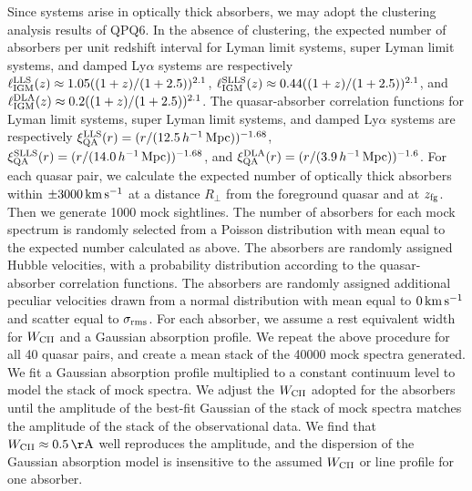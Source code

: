 \documentclass[iop]{emulateapj}
\begin{document}
Since  systems arise in optically thick absorbers, we may adopt the clustering analysis
results of QPQ6. In the absence of clustering, the expected number of absorbers per unit redshift
interval for Lyman limit systems, super Lyman limit systems, and damped Ly$\alpha$ systems are
respectively $\ell_{\rm IGM}^{\rm LLS}(z)\approx1.05((1+z)/(1+2.5))^{2.1}$,
$\ell_{\rm IGM}^{\rm SLLS}(z)\approx0.44((1+z)/(1+2.5))^{2.1}$, and
$\ell_{\rm IGM}^{\rm DLA}(z)\approx0.2((1+z)/(1+2.5))^{2.1}$. The quasar-absorber correlation
functions for Lyman limit systems, super Lyman limit systems, and damped Ly$\alpha$ systems are
respectively $\xi_{\rm QA}^{\rm LLS}(r)=(r/(12.5\,h^{-1}\,{\rm Mpc}))^{-1.68}$,
$\xi_{\rm QA}^{\rm SLLS}(r)=(r/(14.0\,h^{-1}\,{\rm Mpc}))^{-1.68}$, and
$\xi_{\rm QA}^{\rm DLA}(r)=(r/(3.9\,h^{-1}\,{\rm Mpc}))^{-1.6}$.
For each quasar pair, we calculate the expected number of optically thick absorbers within
$\pm3000\,{\rm km\,s^{-1}}$ at a distance $R_\perp$ from the foreground quasar and at
$z_{\rm fg}$. Then we generate 1000 mock sightlines. The number of absorbers for each mock
spectrum is randomly selected from a Poisson distribution with mean equal to the expected number
calculated as above. The absorbers are randomly assigned Hubble velocities, with a probability
distribution according to the quasar-absorber correlation functions. The absorbers are randomly
assigned additional peculiar velocities drawn from a normal distribution with mean equal to
$0\,{\rm km\,s^{-1}}$ and scatter equal to $\sigma_{\rm rms}$. For each absorber, we assume a rest
equivalent width for  $W_{\rm CII}$ and a Gaussian absorption profile. We repeat the
above procedure for all 40 quasar pairs, and create a mean stack of the 40000 mock spectra
generated. We fit a Gaussian absorption profile multiplied to a constant continuum level to model
the stack of mock spectra. We adjust the $W_{\rm CII}$ adopted for the absorbers until the
amplitude of the best-fit Gaussian of the stack of mock spectra matches the amplitude of the stack
of the observational data. We find that $W_{\rm CII}\approx0.5\,{\rm \AA}$ well reproduces the
amplitude, and the dispersion of the Gaussian absorption model is insensitive to the assumed
$W_{\rm CII}$ or line profile for one absorber.
\end{document}
